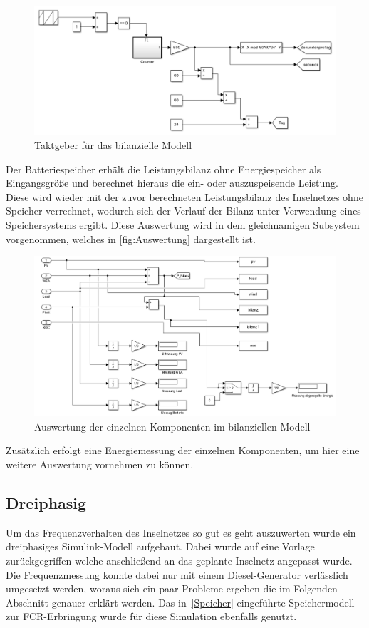 \begin{figure}[H]
	\centering
	\includegraphics[width=0.9\linewidth]{Abbildungen/Clock.png}
	\caption{Taktgeber für das bilanzielle Modell}
	\label{fig:clock}
\end{figure}

Der Batteriespeicher erhält die Leistungsbilanz ohne Energiespeicher als Eingangsgröße und berechnet hieraus die ein- oder auszuspeisende Leistung. Diese wird wieder mit der zuvor berechneten Leistungsbilanz des Inselnetzes ohne Speicher verrechnet, wodurch sich der Verlauf der Bilanz unter Verwendung eines Speichersystems ergibt. Diese Auswertung wird in dem gleichnamigen Subsystem vorgenommen, welches in \autoref{fig:Auswertung} dargestellt ist.

\begin{figure}[H]
	\centering
	\includegraphics[width=0.9\linewidth]{Abbildungen/Auswertung.png}
	\caption{Auswertung der einzelnen Komponenten im bilanziellen Modell}
	\label{fig:Auswertung}
\end{figure}

Zusätzlich erfolgt eine Energiemessung der einzelnen Komponenten, um hier eine weitere Auswertung vornehmen zu können.

\subsection{Dreiphasig}\label{3phase}
Um das Frequenzverhalten des Inselnetzes so gut es geht auszuwerten wurde ein dreiphasiges Simulink-Modell aufgebaut.
Dabei wurde auf eine Vorlage zurückgegriffen welche anschließend an das geplante Inselnetz angepasst wurde.
Die Frequenzmessung konnte dabei nur mit einem Diesel-Generator verlässlich umgesetzt werden, woraus sich ein paar Probleme ergeben
die im Folgenden Abschnitt genauer erklärt werden.
Das in~\ref{Speicher} eingeführte Speichermodell zur FCR-Erbringung wurde für diese Simulation ebenfalls genutzt.

